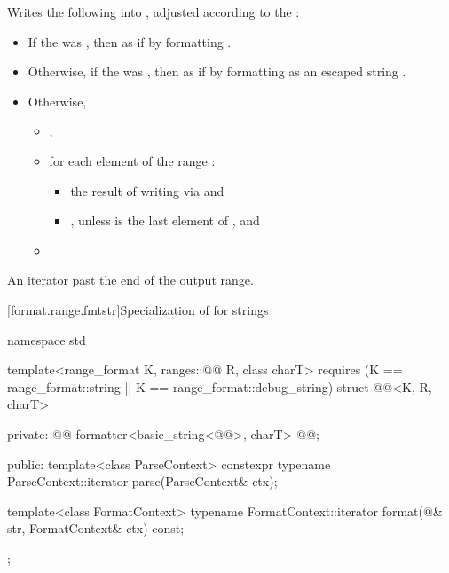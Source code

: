 \documentclass{wg21}
\begin{document}
\begin{itemdescr}
\pnum
\effects
Writes the following into ,
adjusted according to the :

\begin{itemize}
    \item
    If the  was ,
    then as if by formatting 
    .
    \item
    Otherwise, if the  was ,
    then as if by formatting 
    as an escaped string .
    \item
    Otherwise,
    \begin{itemize}
        \item
        ,
        \item
        for each element  of the range :
        \begin{itemize}
            \item
            the result of writing  via  and
            \item
            , unless  is the last element of , and
        \end{itemize}
        \item
        .
    \end{itemize}
\end{itemize}

\pnum
\returns
An iterator past the end of the output range.
\end{itemdescr}


[format.range.fmtstr]{Specialization of  for strings}

%
\begin{codeblock}
namespace std {
template<range_format K, ranges::@@ R, class charT>
requires (K == range_format::string || K == range_format::debug_string)
struct @@<K, R, charT> {
    private:
    @@
    formatter<basic_string<@@>, charT> @@;

    public:
    template<class ParseContext>
    constexpr typename ParseContext::iterator
    parse(ParseContext& ctx);

    template<class FormatContext>
    typename FormatContext::iterator
    format(@\seebelow@& str, FormatContext& ctx) const;
};
}
\end{codeblock}
\end{document}
